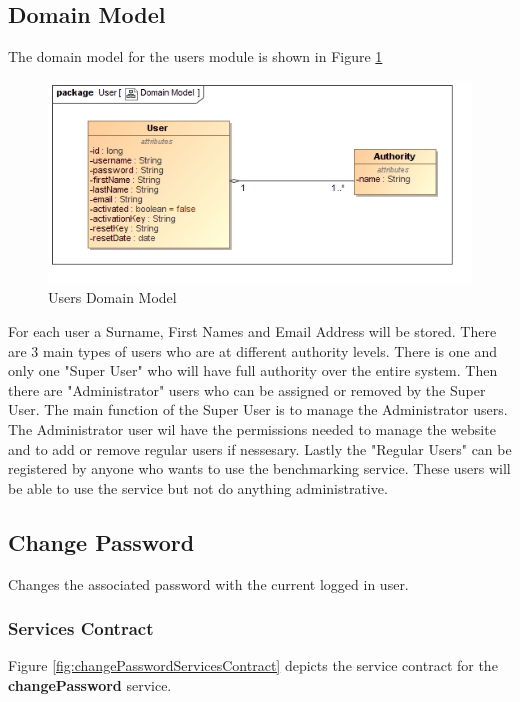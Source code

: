 \subsection{Domain Model}
The domain model for the users module is shown in Figure \ref{Users Domain Model}
\begin{figure}[H]
  \begin{center}
  \includegraphics[scale=1.0]{../Diagrams and Charts/Users/Domain Model.jpg}
  \caption{Users Domain Model}
  \end{center}
  \label{Users Domain Model}
\end{figure}
For each user a Surname, First Names and Email Address will be stored.
There are 3 main types of users who
are at different authority levels. There is one and only one "Super User" who
will have full authority over the entire system. Then there are "Administrator"
users who can be assigned or removed by the Super User. The main function of
the Super User is to manage the Administrator users. The Administrator user
wil have the permissions needed to manage the website and to add or remove
regular users if nessesary. Lastly the "Regular Users"
can be registered by anyone who wants to use the benchmarking service. These users
will be able to use the service but not do anything administrative.

\subsection{Change Password}
Changes the associated password with the current logged in user.

\subsubsection{Services Contract}
Figure \ref{fig:changePasswordServicesContract} depicts the service contract for the \textbf{changePassword} service.

